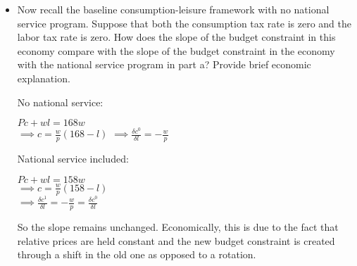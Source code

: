 \documentclass[11pt]{SelfArxOneColBMN}
\begin{document}
\begin{exercise}
\begin{itemize}
\begin{solution}
		\end{solution}
		\item Now recall the baseline consumption-leisure framework with no national service program. Suppose that both the consumption tax rate is zero and the labor tax rate is zero. How does the slope of the budget constraint in this economy compare with the slope of the budget constraint in the economy with the national service program in part a? Provide brief economic explanation.
		\begin{solution}
			No national service: \\
			\begin{center}
				$Pc + wl = 168w$\\
				$\implies c = \frac{w}{p}(168 - l)$
				$\implies \frac{\delta c^0}{\delta l} = -\frac{w}{p}$
			\end{center}
			National service included:
			\begin{center}
				$Pc + wl = 158w$\\
				$\implies c = \frac{w}{p}(158 - l)$\\
				$\implies \frac{\delta c^1}{\delta l} = -\frac{w}{p} = \frac{\delta c^0}{\delta l}$
			\end{center}
			So the slope remains unchanged. Economically, this is due to the fact that relative prices are held constant and the new budget constraint is created through a shift in the old one as opposed to a rotation.
		\end{solution}
	\end{itemize}
\end{exercise}
\end{document}
